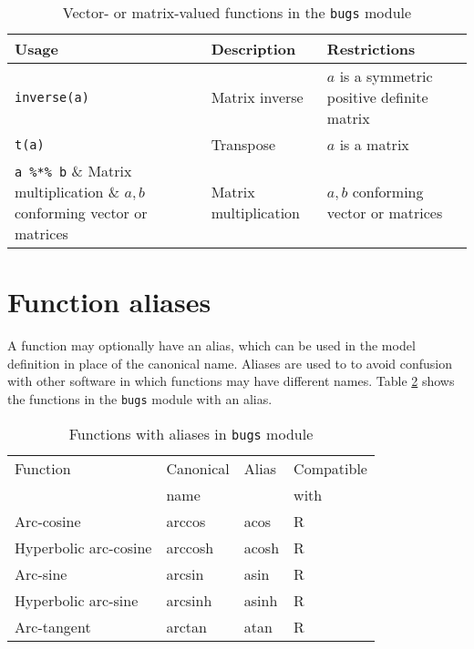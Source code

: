 \documentclass[11pt, a4paper, titlepage]{report}
\begin{document}
\begin{table}[h!]
\begin{center}
\begin{tabular}{lll}
\hline
Usage & Description & Restrictions \\
\hline
\verb+inverse(a)+ & Matrix inverse & $a$ is a symmetric positive definite matrix  \\
\verb+t(a)+    & Transpose                & $a$ is a matrix \\
\verb+a %*% b+  & Matrix multiplication & $a,b$ conforming vector or matrices\\

\hline
\end{tabular}
\caption{Vector- or matrix-valued functions in the \texttt{bugs}
  module \label{table:bugs:vector}}
\end{center}
\end{table}

\section{Function aliases}

A function may optionally have an alias, which can be used in the
model definition in place of the canonical name. Aliases are used to
to avoid confusion with other software in which functions may have
different names. Table \ref{table:bugs:functions:alias} shows the
functions in the \texttt{bugs} module with an alias.

\begin{table}[h!]
\begin{center}
\begin{tabular}{llll}
\hline
Function               & Canonical & Alias & Compatible  \\
                       & name      &       & with         \\
\hline
Arc-cosine             & arccos    & acos  & R \\
Hyperbolic arc-cosine  & arccosh   & acosh & R \\
Arc-sine               & arcsin    & asin  & R \\
Hyperbolic arc-sine    & arcsinh   & asinh & R \\
Arc-tangent            & arctan    & atan  & R \\
\hline
\end{tabular}
\caption{Functions with aliases in \texttt{bugs} module
  \label{table:bugs:functions:alias}}
\end{center}
\end{table}
\end{document}

